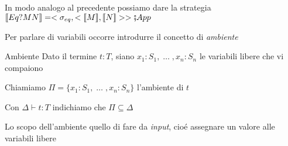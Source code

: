 \documentclass{beamer}
\begin{document}
\begin{frame}
			
	
	In modo analogo al precedente possiamo dare la strategia $\llbracket Eq? M N \rrbracket=<\sigma_{eq}, < \llbracket M \rrbracket , \llbracket N \rrbracket > > \fatsemi App$
	
	
\end{frame}

\begin{frame}
	
	Per parlare di variabili occorre introdurre il concetto di \emph{ambiente}
	
	\begin{block}{Ambiente}
		Dato il termine $t:T$, siano $x_1:S_1 ,\; \dots \; ,x_n :S_n$ le variabili libere che vi compaiono
		
		Chiamiamo $\Pi = \{ x_1:S_1 , \; \dots \; ,x_n :S_n \}$ l'ambiente di $t$
		
	\end{block}
	
	Con $\Delta \vdash t:T$ indichiamo che $\Pi \subseteq \Delta$
	
	Lo scopo dell'ambiente quello di fare da \emph{input}, cioé assegnare un valore alle variabili libere
	
	
	
\end{frame}
\end{document}
